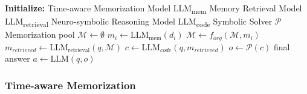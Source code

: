 \begin{algorithm}
\small
\caption{TReMu} \label{algo1}
\begin{algorithmic}
\STATE \textbf{Initialize:} 
\STATE Time-aware Memorization Model LLM\textsubscript{mem}
\STATE Memory Retrieval Model LLM\textsubscript{retrieval}
\STATE Neuro-symbolic Reasoning Model LLM\textsubscript{code}
\STATE Symbolic Solver $\mathcal{P}$
\STATE Memorization pool $\mathcal{M} \leftarrow \emptyset $
\STATE {}
    \STATE \( m_i \leftarrow \text{LLM}_\text{mem}(d_i) \)
    \STATE \( \mathcal{M} \leftarrow f_{org} ( \mathcal{M}, m_i ) \)
\ENDFOR
\STATE {}
\STATE  \(m_{retrieved} \leftarrow \text{LLM}_\text{retrieval}(q, \mathcal{M})\)
\STATE \(c \leftarrow \text{LLM}_{code}(q, m_{retrieved})\)
\STATE \(o \leftarrow \mathcal{P}(c)\)
\STATE final answer \(a \leftarrow \text{LLM}(q, o)\)
\ENDFOR
\end{algorithmic}
\end{algorithm}

\subsubsection{Time-aware Memorization} 

